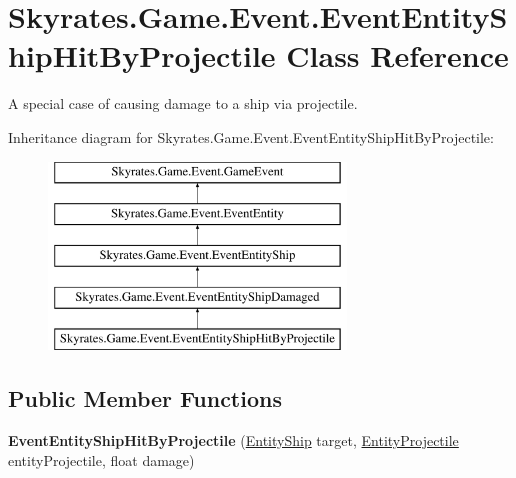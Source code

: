 \hypertarget{class_skyrates_1_1_game_1_1_event_1_1_event_entity_ship_hit_by_projectile}{\section{Skyrates.\-Game.\-Event.\-Event\-Entity\-Ship\-Hit\-By\-Projectile Class Reference}
\label{class_skyrates_1_1_game_1_1_event_1_1_event_entity_ship_hit_by_projectile}
}


A special case of causing damage to a ship via projectile.  


Inheritance diagram for Skyrates.\-Game.\-Event.\-Event\-Entity\-Ship\-Hit\-By\-Projectile\-:\begin{figure}[H]
\begin{center}
\leavevmode
\includegraphics[height=5.000000cm]{class_skyrates_1_1_game_1_1_event_1_1_event_entity_ship_hit_by_projectile}
\end{center}
\end{figure}
\subsection*{Public Member Functions}
\begin{DoxyCompactItemize}
\item 
\hypertarget{class_skyrates_1_1_game_1_1_event_1_1_event_entity_ship_hit_by_projectile_af19832cccf7fcff2ccbee0539d6534d7}{{\bfseries Event\-Entity\-Ship\-Hit\-By\-Projectile} (\hyperlink{class_skyrates_1_1_entity_1_1_entity_ship}{Entity\-Ship} target, \hyperlink{class_skyrates_1_1_entity_1_1_entity_projectile}{Entity\-Projectile} entity\-Projectile, float damage)}\label{class_skyrates_1_1_game_1_1_event_1_1_event_entity_ship_hit_by_projectile_af19832cccf7fcff2ccbee0539d6534d7}

\end{DoxyCompactItemize}
